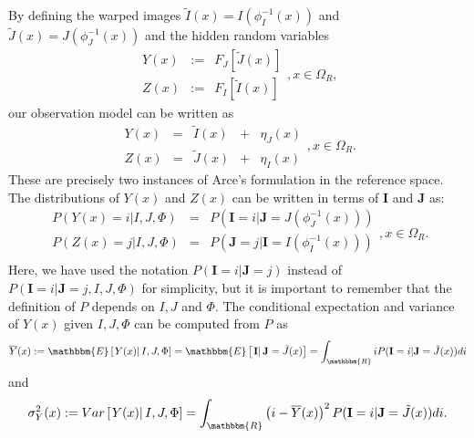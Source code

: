 By defining the warped images \hbox{$\tilde{I}(x) = I(\phi_{I}^{-1}(x))$} and \hbox{$\tilde{J}(x) = J(\phi_{J}^{-1}(x))$} and the hidden random variables \citep{Dempster1977, Li2001}
\begin{equation}\label{eq:hidden_fields}
    \begin{array}{ccc}
        Y(x) &:=& F_{J}\left[\tilde{J}(x)\right]\\[+2mm]
        Z(x) &:=& F_{I}\left[\tilde{I}(x)\right]
    \end{array},x\in\Omega_{R},
\end{equation}
our observation model can be written as
\begin{equation}\label{eq:SyNEM_gom_update}
    \begin{array}{ccccc}
    	Y(x) &=& \tilde{I}(x) &+& \eta_{J}(x)\\
        Z(x) &=& \tilde{J}(x) &+& \eta_{I}(x)
    \end{array}, x\in\Omega_{R}.
\end{equation}
These are precisely two instances of Arce's formulation \citep[see][eq. 1]{Arce-santana2014} in the reference space. The distributions of $Y(x)$ and $Z(x)$ can be written in terms of $\mathbf{I}$ and $\mathbf{J}$ as:
\begin{equation}\label{eq:y_z_i_j_relationship}
    \begin{array}{ccccc}
    	P(Y(x) = i | I, J, \Phi) &=& P(\mathbf{I}=i | \mathbf{J} = J(\phi_{J}^{-1}(x)))\\
        P(Z(x) = j | I, J, \Phi) &=& P(\mathbf{J}=j | \mathbf{I} = I(\phi_{I}^{-1}(x)))\\
    \end{array}, x\in\Omega_{R}.
\end{equation}
Here, we have used the notation $P(\mathbf{I}=i | \mathbf{J} = j)$ instead of \hbox{$P(\mathbf{I}=i | \mathbf{J} = j, I, J, \Phi)$} for simplicity, but it is important to remember that the definition of $P$ depends on $I, J$ and $\Phi$. The conditional expectation and variance of $Y(x)$ given $I, J, \Phi$ can be computed from $P$ as
\begin{equation}\label{eq:expectation_transfer}
    \overline{Y}(x) := \mathbbm{E}\left[\left.Y(x) \right| I, J, \Phi\right] = \mathbbm{E}\left[\left.\mathbf{I} \right| \mathbf{J} = \tilde{J}(x)\right] =
    \int_{\mathbbm{R}} i P(\mathbf{I}=i | \mathbf{J}=\tilde{J}(x)) di
\end{equation}
and
\begin{equation}\label{eq:expectation_variance}
    \sigma_{Y}^{2}(x) := Var\left[\left.Y(x) \right| I, J, \Phi\right] = \int_{\mathbbm{R}} \left(i - \overline{Y}(x)\right)^{2} P(\mathbf{I}=i | \mathbf{J}=\tilde{J}(x)) di.
\end{equation}
